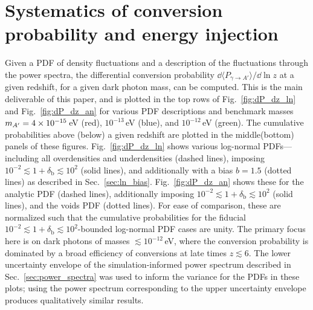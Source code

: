 \documentclass[prd,aps,10pt,nofootinbib,twocolumn,superscriptaddress,preprintnumbers,balancelastpage,longbibliography]{revtex4-1}
\begin{document}
\section{Systematics of conversion probability and energy injection}
\label{sec:results}

Given a PDF of density fluctuations and a description of the fluctuations through the power spectra, the differential conversion probability $\dd \langle P_{\gamma \to A'} \rangle / \dd \ln z$ at a given redshift, for a given dark photon mass, can be computed. This is the main deliverable of this paper, and is plotted in the top rows of Fig.~\ref{fig:dP_dz_ln} and Fig.~\ref{fig:dP_dz_an} for various PDF descriptions and benchmark masses $m_{A^\prime} = 4\times10^{-15}$\,eV (red), $10^{-13}$\,eV (blue), and $10^{-12}$\,eV (green). The cumulative probabilities above (below) a given redshift are plotted in the middle(bottom) panels of these figures. Fig.~\ref{fig:dP_dz_ln} shows various log-normal PDFs---including all overdensities and underdensities (dashed lines), imposing $10^{-2} \lesssim 1 + \delta_\text{b} \lesssim 10^2$ (solid lines), and additionally with a bias $b=1.5$ (dotted lines) as described in Sec.~\ref{sec:ln_bias}. Fig.~\ref{fig:dP_dz_an} shows these for the analytic PDF (dashed lines), additionally imposing $10^{-2} \lesssim 1 + \delta_\text{b} \lesssim 10^2$ (solid lines), and the voids PDF (dotted lines). For ease of comparison, these are normalized such that the cumulative probabilities for the fiducial $10^{-2} \lesssim 1 + \delta_\text{b} \lesssim 10^2$-bounded log-normal PDF cases are unity. The primary focus here is on dark photons of masses $\lesssim 10^{-12}$\,eV, where the conversion probability is dominated by a broad efficiency of conversions at late times $z \lesssim 6$. The lower uncertainty envelope of the simulation-informed power spectrum described in Sec.~\ref{sec:power_spectra} was used to inform the variance for the PDFs in these plots; using the power spectrum corresponding to the upper uncertainty envelope produces qualitatively similar results. 
\end{document}
